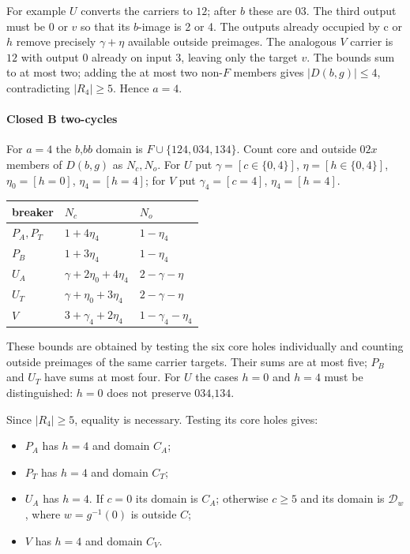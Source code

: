 \documentclass[11pt]{article}
\theoremstyle{definition}
\theoremstyle{plain}
\begin{document}
For example \(U\) converts the carriers to \(12\); after \(b\) these are \(03\).
The third output must be 0 or \(v\) so that its \(b\)-image is 2 or 4.
The outputs already occupied by c or \(h\) remove precisely \(\gamma+\eta\)
available outside preimages. The analogous \(V\) carrier is \(12\) with
output 0 already on input 3, leaving only the target \(v\). The bounds
sum to at most two; adding the at most two non-\(F\) members gives
\(|D(b,g)|\le4\), contradicting \(|R_{4}|\ge 5\).
Hence \(a=4\).

\paragraph{Closed B two-cycles}\label{closed-b-two-cycles}

For \(a=4\) the \(b\),\(bb\) domain is \(F\cup\{124,034,134\}\). Count
core and outside \(02x\) members of \(D(b,g)\) as \(N_c,N_o\). For \(U\) put
\(\gamma=[c\in \{0,4\}]\), \(\eta=[h\in \{0,4\}]\),
\(\eta_{0}=[h=0]\), \(\eta_{4}=[h=4]\); for \(V\) put
\(\gamma_{4}=[c=4]\), \(\eta_{4}=[h=4]\).

\begin{center}
\begin{tabular}{lll}
\toprule
breaker  &  \(N_c\)  &  \(N_o\) \\
\midrule

\(P_A,P_T\) & \(1+4\eta_{4}\) & \(1-\eta_{4}\)\\
\(P_B\) & \(1+3\eta_{4}\) & \(1-\eta_{4}\)\\
\(U_A\) & \(\gamma+2\eta_{0}+4\eta_{4}\) & \(2-\gamma-\eta\)\\
\(U_T\) & \(\gamma+\eta_{0}+3\eta_{4}\) & \(2-\gamma-\eta\)\\
\(V\) & \(3+\gamma_{4}+2\eta_{4}\) & \(1-\gamma_{4}-\eta_{4}\)\\
\bottomrule
\end{tabular}
\end{center}

These bounds are obtained by testing the six core holes individually and
counting outside preimages of the same carrier targets. Their sums are
at most five; \(P_B\) and \(U_T\) have sums at most four. For \(U\) the
cases \(h=0\) and \(h=4\) must be distinguished: \(h=0\) does not
preserve \(034\),\(134\).

Since \(|R_{4}|\ge 5\), equality is necessary. Testing its core holes
gives:

\begin{itemize}
\item
  \(P_A\) has \(h=4\) and domain \(C_A\);
\item
  \(P_T\) has \(h=4\) and domain \(C_T\);
\item
  \(U_A\) has \(h=4\). If \(c=0\) its domain is \(C_A\); otherwise
  \(c\ge 5\) and its domain is \(\mathcal D_w\), where \(w=g^{-1}(0)\) is
  outside \(C\);
\item
  \(V\) has \(h=4\) and domain \(C_V\).
\end{itemize}
\end{document}
